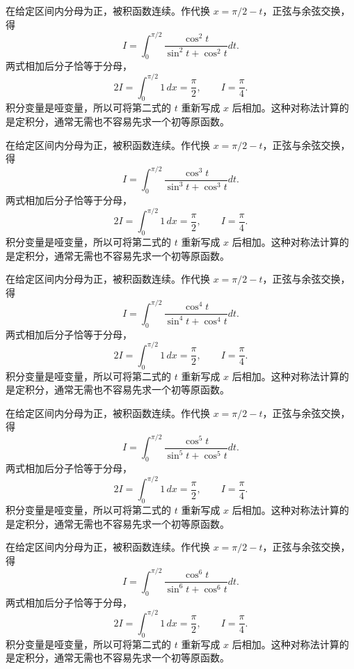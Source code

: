\documentclass[12pt,fontset=fandol]{ctexart}
\begin{document}
\begin{solve}\label{ans:c17q22}
在给定区间内分母为正，被积函数连续。作代换 $x=\pi/2-t$，正弦与余弦交换，得
\[
I=\int_0^{\pi/2}\frac{\cos^{2}t}{\sin^{2}t+\cos^{2}t}dt.
\]
两式相加后分子恰等于分母，
\[
2I=\int_0^{\pi/2}1\,dx=\frac\pi2,\qquad I=\frac\pi4.
\]
积分变量是哑变量，所以可将第二式的 $t$ 重新写成 $x$ 后相加。这种对称法计算的是定积分，通常无需也不容易先求一个初等原函数。
\end{solve}

\begin{solve}\label{ans:c17q23}
在给定区间内分母为正，被积函数连续。作代换 $x=\pi/2-t$，正弦与余弦交换，得
\[
I=\int_0^{\pi/2}\frac{\cos^{3}t}{\sin^{3}t+\cos^{3}t}dt.
\]
两式相加后分子恰等于分母，
\[
2I=\int_0^{\pi/2}1\,dx=\frac\pi2,\qquad I=\frac\pi4.
\]
积分变量是哑变量，所以可将第二式的 $t$ 重新写成 $x$ 后相加。这种对称法计算的是定积分，通常无需也不容易先求一个初等原函数。
\end{solve}

\begin{solve}\label{ans:c17q24}
在给定区间内分母为正，被积函数连续。作代换 $x=\pi/2-t$，正弦与余弦交换，得
\[
I=\int_0^{\pi/2}\frac{\cos^{4}t}{\sin^{4}t+\cos^{4}t}dt.
\]
两式相加后分子恰等于分母，
\[
2I=\int_0^{\pi/2}1\,dx=\frac\pi2,\qquad I=\frac\pi4.
\]
积分变量是哑变量，所以可将第二式的 $t$ 重新写成 $x$ 后相加。这种对称法计算的是定积分，通常无需也不容易先求一个初等原函数。
\end{solve}

\begin{solve}\label{ans:c17q25}
在给定区间内分母为正，被积函数连续。作代换 $x=\pi/2-t$，正弦与余弦交换，得
\[
I=\int_0^{\pi/2}\frac{\cos^{5}t}{\sin^{5}t+\cos^{5}t}dt.
\]
两式相加后分子恰等于分母，
\[
2I=\int_0^{\pi/2}1\,dx=\frac\pi2,\qquad I=\frac\pi4.
\]
积分变量是哑变量，所以可将第二式的 $t$ 重新写成 $x$ 后相加。这种对称法计算的是定积分，通常无需也不容易先求一个初等原函数。
\end{solve}

\begin{solve}\label{ans:c17q26}
在给定区间内分母为正，被积函数连续。作代换 $x=\pi/2-t$，正弦与余弦交换，得
\[
I=\int_0^{\pi/2}\frac{\cos^{6}t}{\sin^{6}t+\cos^{6}t}dt.
\]
两式相加后分子恰等于分母，
\[
2I=\int_0^{\pi/2}1\,dx=\frac\pi2,\qquad I=\frac\pi4.
\]
积分变量是哑变量，所以可将第二式的 $t$ 重新写成 $x$ 后相加。这种对称法计算的是定积分，通常无需也不容易先求一个初等原函数。
\end{solve}
\end{document}

